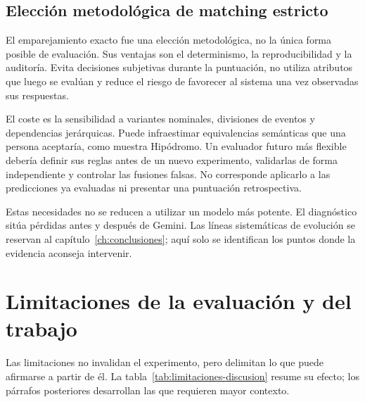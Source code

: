 \subsection{Elección metodológica de matching estricto}
El emparejamiento exacto fue una elección metodológica, no la única forma
posible de evaluación. Sus ventajas son el determinismo, la reproducibilidad
y la auditoría. Evita decisiones subjetivas durante la puntuación, no utiliza
atributos que luego se evalúan y reduce el riesgo de favorecer al sistema una
vez observadas sus respuestas.

El coste es la sensibilidad a variantes nominales, divisiones de eventos y
dependencias jerárquicas. Puede infraestimar equivalencias semánticas que una
persona aceptaría, como muestra Hipódromo. Un evaluador futuro más flexible
debería definir sus reglas antes de un nuevo experimento, validarlas de forma
independiente y controlar las fusiones falsas. No corresponde aplicarlo a las
predicciones ya evaluadas ni presentar una puntuación retrospectiva.

Estas necesidades no se reducen a utilizar un modelo más potente. El
diagnóstico sitúa pérdidas antes y después de Gemini. Las líneas sistemáticas
de evolución se reservan al capítulo~\ref{ch:conclusiones}; aquí solo se
identifican los puntos donde la evidencia aconseja intervenir.

\section{Limitaciones de la evaluación y del trabajo}
Las limitaciones no invalidan el experimento, pero delimitan lo que puede
afirmarse a partir de él. La tabla~\ref{tab:limitaciones-discusion} resume su
efecto; los párrafos posteriores desarrollan las que requieren mayor contexto.

